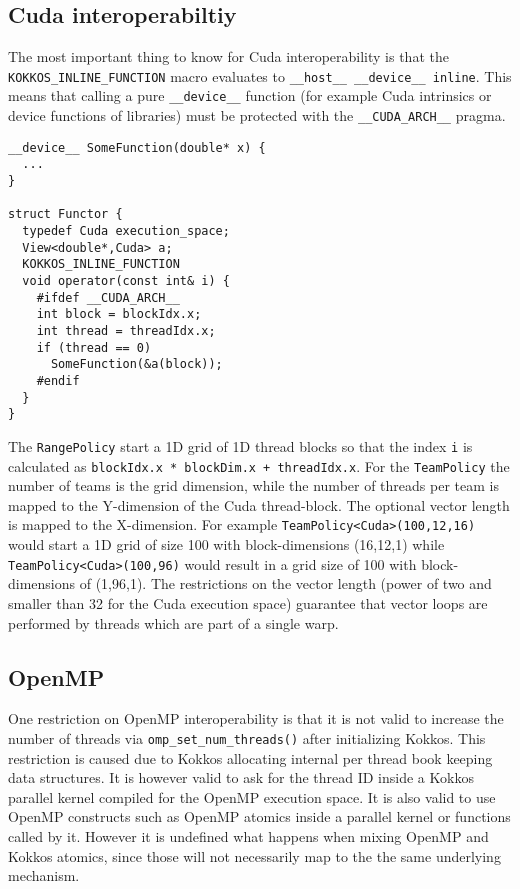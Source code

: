 \subsection{Cuda interoperabiltiy}

The most important thing to know for Cuda interoperability is that the
\lstinline|KOKKOS_INLINE_FUNCTION| macro evaluates to 
\lstinline|__host__ __device__ inline|. This means that calling a pure
\lstinline|__device__| function (for example Cuda intrinsics or device 
functions of libraries) must be protected with the \lstinline|__CUDA_ARCH__|
pragma.

\begin{lstlisting}
__device__ SomeFunction(double* x) {
  ...
}

struct Functor {
  typedef Cuda execution_space;
  View<double*,Cuda> a;
  KOKKOS_INLINE_FUNCTION
  void operator(const int& i) {
    #ifdef __CUDA_ARCH__
    int block = blockIdx.x;
    int thread = threadIdx.x;
    if (thread == 0)
      SomeFunction(&a(block));
    #endif
  }
}
\end{lstlisting}

The \lstinline|RangePolicy| start a 1D grid of 1D thread blocks so that the index 
\lstinline|i| is calculated as \lstinline|blockIdx.x * blockDim.x + threadIdx.x|. 
For the \lstinline|TeamPolicy| the number of teams is the grid dimension, while
the number of threads per team is mapped to the Y-dimension of the Cuda 
thread-block. The optional vector length is mapped to the X-dimension. 
For example \lstinline|TeamPolicy<Cuda>(100,12,16)| would start a 1D grid of size 
100 with block-dimensions (16,12,1) while \lstinline|TeamPolicy<Cuda>(100,96)| would 
result in a grid size of 100 with block-dimensions of (1,96,1). The restrictions on the 
vector length (power of two and smaller than 32 for the Cuda execution space) 
guarantee that vector loops are performed by threads which are part of a single 
warp. 

\subsection{OpenMP}

One restriction on OpenMP interoperability is that it is not valid to increase
the number of threads via \lstinline|omp_set_num_threads()| after initializing 
Kokkos. This restriction is caused due to Kokkos allocating internal per thread
book keeping data structures. It is however valid to ask 
for the thread ID inside a Kokkos parallel kernel compiled for the OpenMP 
execution space. It is also valid to use OpenMP constructs such as OpenMP
atomics inside a parallel kernel or functions called by it. However it is undefined
what happens when mixing OpenMP and Kokkos atomics, since those will not 
necessarily map to the the same underlying mechanism. 



